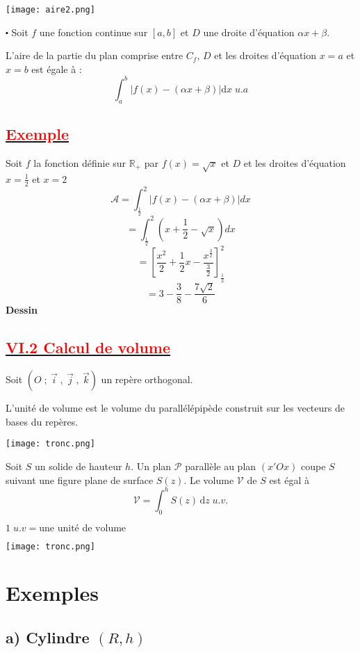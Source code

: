 \documentclass[12pt]{article}
\begin{document}
    \texttt{[image: aire2.png]}


$\centerdot$ Soit $f$ une fonction continue sur $[a, b]$ et $D$ une droite d'équation $\alpha x + \beta.$

L'aire de la partie du plan comprise entre $C_{f}$, $D$ et les droites d'équation $x=a$ et $x=b$ est égale à :
$$\int_{a}^{b}|f(x)-(\alpha x+\beta)|\mathrm{d}x\;u.a$$

\subsection*{\underline{\textbf{\textcolor{red}{Exemple }}}}
Soit $f$ la fonction définie sur $\mathbb{R}_{+}$ par $f(x)=\sqrt{x}$ et $D$ et les droites d'équation $x=\frac{1}{2}$ et $x=2$ 
\[\mathcal{A}=\int_{\frac{1}{2}}^{2}|f(x)-(\alpha x+\beta)|dx\]
\[=\int_{\frac{1}{2}}^{2}(x+\frac{1}{2}-\sqrt{x})dx\]
\[= \left[ \frac{x^{2}}{2}+\frac{1}{2}x-\frac{x^{\frac{3}{2}}}{\frac{3}{2}} \right]_{\frac{1}{2}}^{2}  \]
\[=3-\frac{3}{8}-\frac{7\sqrt{2}}{6}\]
\textbf{Dessin}
\subsection*{\underline{\textbf{\textcolor{red}{VI.2 Calcul de volume}}}}
Soit $(O\;;\ \vec{i}\;,\ \vec{j}\;,\ \vec{k})$ un repère orthogonal.

L'unité de volume est le volume du parallélépipède construit sur les vecteurs de bases du repères.
\begin{center}
    \texttt{[image: tronc.png]}
\end{center}
Soit $S$ un solide de hauteur $h$. Un plan $\mathcal{P}$ parallèle au plan $(x'Ox)$ coupe $S$ suivant une figure plane de surface $S(z)$. Le volume $\mathcal{V}$ de $S$ est égal à 
$$\mathcal{V}=\int_{0}^{h} S(z) \, \mathrm{d}z \; u.v.$$

$1\;u.v = \text{une unité de volume}$

\begin{center}
    \texttt{[image: tronc.png]}
\end{center}

\section*{Exemples}

\subsection*{a) Cylindre $(R, h)$}
\end{document}
